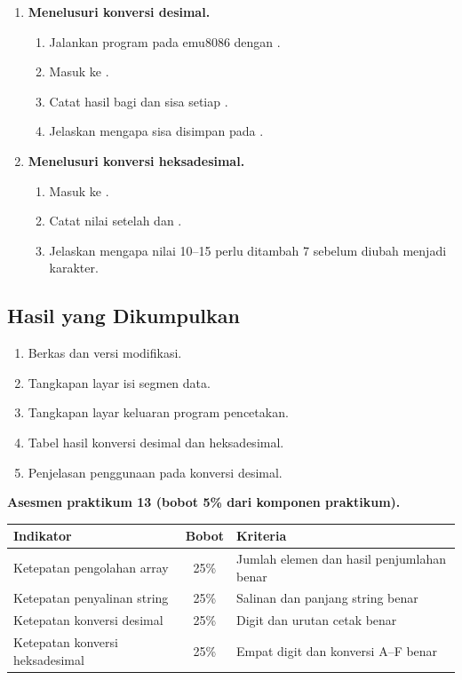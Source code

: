 \begin{enumerate}
    \item \textbf{Menelusuri konversi desimal.}
    \begin{enumerate}
        \item Jalankan program pada emu8086 dengan .
        \item Masuk ke .
        \item Catat hasil bagi dan sisa setiap .
        \item Jelaskan mengapa sisa disimpan pada .
    \end{enumerate}

    \item \textbf{Menelusuri konversi heksadesimal.}
    \begin{enumerate}
        \item Masuk ke .
        \item Catat nilai  setelah  dan
              .
        \item Jelaskan mengapa nilai 10--15 perlu ditambah 7 sebelum
              diubah menjadi karakter.
    \end{enumerate}
\end{enumerate}

\subsection{Hasil yang Dikumpulkan}

\begin{enumerate}
    \item Berkas  dan
           versi modifikasi.
    \item Tangkapan layar isi segmen data.
    \item Tangkapan layar keluaran program pencetakan.
    \item Tabel hasil konversi desimal dan heksadesimal.
    \item Penjelasan penggunaan  pada konversi desimal.
\end{enumerate}

\begin{asesmenbox}
\vspace{1.1em}
\textbf{Asesmen praktikum 13 (bobot 5\% dari komponen praktikum).}

\begin{tabular}{@{}p{6.2cm}cp{4.6cm}@{}}
    \toprule
    \textbf{Indikator} & \textbf{Bobot} & \textbf{Kriteria} \\
    \midrule
    Ketepatan pengolahan array & 25\% &
    Jumlah elemen dan hasil penjumlahan benar \\
    \addlinespace
    Ketepatan penyalinan string & 25\% &
    Salinan dan panjang string benar \\
    \addlinespace
    Ketepatan konversi desimal & 25\% &
    Digit dan urutan cetak benar \\
    \addlinespace
    Ketepatan konversi heksadesimal & 25\% &
    Empat digit dan konversi A--F benar \\
    \bottomrule
\end{tabular}
\end{asesmenbox}
